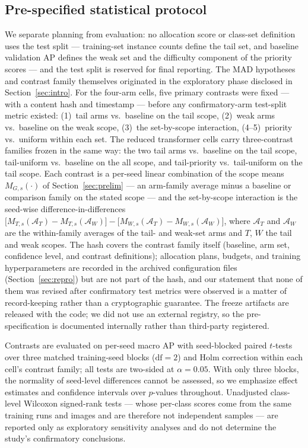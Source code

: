 \documentclass[preprint,12pt,authoryear]{elsarticle}
\begin{document}
\subsection{Pre-specified statistical protocol}\label{sec:stats}

We separate planning from evaluation: no allocation score or
class-set definition uses the test split --- training-set instance
counts define the tail set, and baseline validation AP defines the
weak set and the difficulty component of the priority scores --- and
the test split is reserved for final reporting. The MAD hypotheses and
contrast family themselves originated in the exploratory phase
disclosed in Section~\ref{sec:intro}. For the four-arm cells, five primary
contrasts were fixed --- with a content hash and timestamp --- before
any confirmatory-arm test-split metric existed: (1)~tail arms vs.\
baseline on the tail scope, (2)~weak arms vs.\ baseline on the weak
scope, (3)~the set-by-scope interaction, (4--5)~priority vs.\ uniform
within each set. The reduced transformer cells carry three-contrast
families frozen in the same way: the two tail arms vs.\ baseline on
the tail scope, tail-uniform vs.\ baseline on the all scope, and
tail-priority vs.\ tail-uniform on the tail scope. Each contrast is a
per-seed linear combination of the scope means $M_{G,s}(\cdot)$ of
Section~\ref{sec:prelim} --- an arm-family average minus a baseline or
comparison family on the stated scope --- and the set-by-scope
interaction is the seed-wise difference-in-differences
$\bigl[M_{T,s}(\mathcal{A}_T)-M_{T,s}(\mathcal{A}_W)\bigr]-
\bigl[M_{W,s}(\mathcal{A}_T)-M_{W,s}(\mathcal{A}_W)\bigr]$, where
$\mathcal{A}_T$ and $\mathcal{A}_W$ are the within-family averages of
the tail- and weak-set arms and $T$, $W$ the tail and weak scopes. The
hash covers the
contrast family itself (baseline, arm set, confidence level, and
contrast definitions); allocation plans, budgets, and training
hyperparameters are recorded in the archived configuration files
(Section~\ref{sec:repro}) but are not part of the hash, and our
statement that none of them was revised after confirmatory test
metrics were observed is a matter of record-keeping rather than a
cryptographic guarantee. The freeze artifacts are released with the
code; we did not use an external registry, so the pre-specification is
documented internally rather than third-party registered.

Contrasts are evaluated on per-seed macro AP with seed-blocked paired
$t$-tests over three matched training-seed blocks ($\mathrm{df} = 2$)
and Holm correction \citep{holm1979simple} within each cell's contrast
family; all tests are two-sided at $\alpha = 0.05$. With only three
blocks, the normality of seed-level differences cannot be assessed, so
we emphasize effect estimates and confidence intervals over $p$-values
throughout. Unadjusted class-level Wilcoxon signed-rank tests --- whose
per-class scores come from the same training runs and images and are
therefore not independent samples --- are reported only as exploratory
sensitivity analyses and do not determine the study's confirmatory
conclusions.
\end{document}
